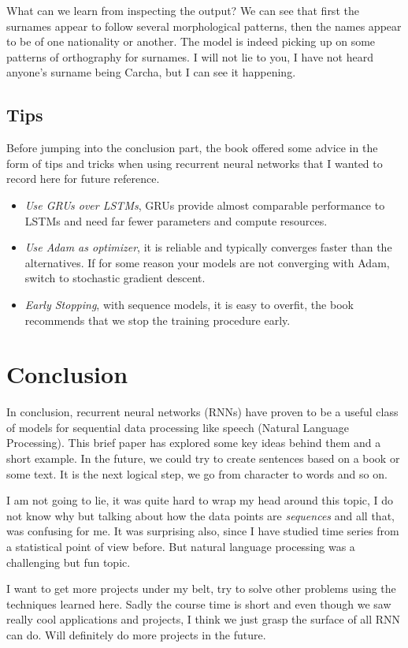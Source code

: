 \documentclass[12pt]{IEEEtran}
\begin{document}
What can we learn from inspecting the output? We can see that first the
surnames appear to follow several morphological patterns, then the names appear
to be of one nationality or another. The model is indeed picking up on some
patterns of orthography for surnames. I will not lie to you, I have not heard
anyone's surname being Carcha, but I can see it happening.

\subsection{Tips}
Before jumping into the conclusion part, the book offered some advice in the
form of tips and tricks when using recurrent neural networks that I wanted to
record here for future reference.

\begin{itemize}
    \item \emph{Use GRUs over LSTMs}, GRUs provide almost comparable
    performance to LSTMs and need far fewer parameters and compute resources.

    \item \emph{Use Adam as optimizer}, it is reliable and typically converges
    faster than the alternatives. If for some reason your models are not
    converging with Adam, switch to stochastic gradient descent.

    \item \emph{Early Stopping}, with sequence models, it is easy to overfit,
    the book recommends that we stop the training procedure early.
\end{itemize}


\section{Conclusion}

In conclusion, recurrent neural networks (RNNs) have proven to be a useful
class of models for sequential data processing like speech (Natural Language
Processing). This brief paper has explored some key ideas behind them and a
short example.  In the future, we could try to create sentences based on a book
or some text. It is the next logical step, we go from character to words and so
on.

I am not going to lie, it was quite hard to wrap my head around this topic, I
do not know why but talking about how the data points are \emph{sequences} and
all that, was confusing for me.  It was surprising also, since I have studied
time series from a statistical point of view before. But natural language
processing was a challenging but fun topic.

I want to get more projects under my belt, try to solve other problems using
the techniques learned here. Sadly the course time is short and even though we
saw really cool applications and projects, I think we just grasp the surface of
all RNN can do. Will definitely do more projects in the future.



\end{document}
